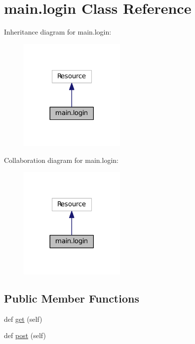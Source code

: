 \hypertarget{classmain_1_1login}{}\section{main.\+login Class Reference}
\label{classmain_1_1login}


Inheritance diagram for main.\+login\+:
\nopagebreak
\begin{figure}[H]
\begin{center}
\leavevmode
\includegraphics[width=146pt]{classmain_1_1login__inherit__graph}
\end{center}
\end{figure}


Collaboration diagram for main.\+login\+:
\nopagebreak
\begin{figure}[H]
\begin{center}
\leavevmode
\includegraphics[width=146pt]{classmain_1_1login__coll__graph}
\end{center}
\end{figure}
\subsection*{Public Member Functions}
\begin{DoxyCompactItemize}
\item 
def \hyperlink{classmain_1_1login_a842b5fefc13556cbae749a8dc58d8e31}{get} (self)
\item 
def \hyperlink{classmain_1_1login_a71ff3f89aaf0f0c8502577445ab38744}{post} (self)
\end{DoxyCompactItemize}


